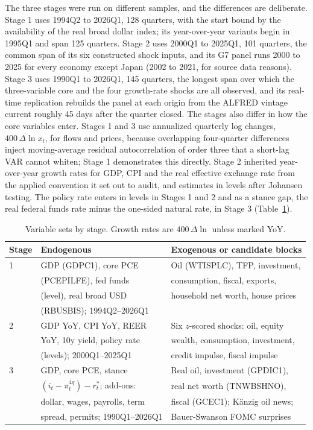 \documentclass[conference]{IEEEtran}
\begin{document}
The three stages were run on different samples, and the differences are deliberate. Stage 1 uses 1994Q2 to 2026Q1, 128 quarters, with the start bound by the availability of the real broad dollar index; its year-over-year variants begin in 1995Q1 and span 125 quarters. Stage 2 uses 2000Q1 to 2025Q1, 101 quarters, the common span of its six constructed shock inputs, and its G7 panel runs 2000 to 2025 for every economy except Japan (2002 to 2021, for source data reasons). Stage 3 uses 1990Q1 to 2026Q1, 145 quarters, the longest span over which the three-variable core and the four growth-rate shocks are all observed, and its real-time replication rebuilds the panel at each origin from the ALFRED vintage current roughly 45 days after the quarter closed. The stages also differ in how the core variables enter. Stages 1 and 3 use annualized quarterly log changes, $400\,\Delta\ln x_t$, for flows and prices, because overlapping four-quarter differences inject moving-average residual autocorrelation of order three that a short-lag VAR cannot whiten; Stage 1 demonstrates this directly. Stage 2 inherited year-over-year growth rates for GDP, CPI and the real effective exchange rate from the applied convention it set out to audit, and estimates in levels after Johansen testing. The policy rate enters in levels in Stages 1 and 2 and as a stance gap, the real federal funds rate minus the one-sided natural rate, in Stage 3 (Table~\ref{tab:data}).

\begin{table}[t]
\caption{Variable sets by stage. Growth rates are $400\,\Delta\ln$ unless marked YoY.}
\label{tab:data}
\centering
\footnotesize
\setlength{\tabcolsep}{2.5pt}
\begin{tabular}{@{}lll@{}}
\toprule
Stage & Endogenous & Exogenous or candidate blocks \\
\midrule
1 & GDP (GDPC1), core PCE & Oil (WTISPLC), TFP, investment, \\
  & (PCEPILFE), fed funds & consumption, fiscal, exports, \\
  & (level), real broad USD & household net worth, house prices \\
  & (RBUSBIS); 1994Q2--2026Q1 & \\
\midrule
2 & GDP YoY, CPI YoY, REER & Six $z$-scored shocks: oil, equity \\
  & YoY, 10y yield, policy rate & wealth, consumption, investment, \\
  & (levels); 2000Q1--2025Q1 & credit impulse, fiscal impulse \\
\midrule
3 & GDP, core PCE, stance & Real oil, investment (GPDIC1), \\
  & $(i_t-\pi^{4q}_t)-r^*_t$; add-ons: & real net worth (TNWBSHNO), \\
  & dollar, wages, payrolls, term & fiscal (GCEC1); K\"anzig oil news; \\
  & spread, permits; 1990Q1--2026Q1 & Bauer-Swanson FOMC surprises \\
\bottomrule
\end{tabular}
\end{table}
\end{document}
